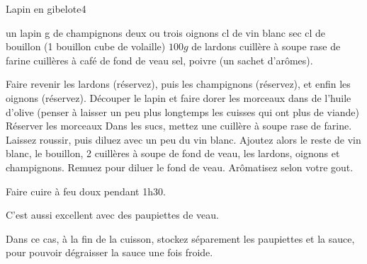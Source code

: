 \begin{recette}{Lapin en gibelote}{4}{}{}
\begin{ingredients}
\ingredient un lapin
 g de champignons
\ingredient deux ou trois oignons
 cl de vin blanc sec
 cl de bouillon (1 bouillon cube de volaille)
\ingredient $100\unit{g}$ de lardons
 cuillère à soupe rase de farine
 cuillères à café de fond de veau
\ingredient sel, poivre (un sachet d'arômes).
\end{ingredients}

\begin{preparation}
\etape Faire revenir les lardons (réservez), puis les champignons (réservez), et enfin les oignons (réservez).
\etape Découper le lapin et faire dorer les morceaux dans de l'huile d'olive (penser à laisser un peu plus longtemps les cuisses qui ont plus de viande)
\etape Réserver les morceaux
\etape Dans les sucs, mettez une cuillère à soupe rase de farine. Laissez roussir, puis diluez avec un peu du vin blanc.
\etape Ajoutez alors le reste de vin blanc, le bouillon, 2 cuillères à soupe de fond de veau, les lardons, oignons et champignons. Remuez pour diluer le fond de veau.
\etape Arômatisez selon votre gout.
\end{preparation}

\begin{cuisson}
Faire cuire à feu doux pendant 1h30.

\begin{remarque}
C'est aussi excellent avec des paupiettes de veau.

Dans ce cas, à la fin de la cuisson, stockez séparement les paupiettes et la sauce, pour pouvoir dégraisser la sauce une fois froide.
\end{remarque}
\end{cuisson}
\end{recette}

